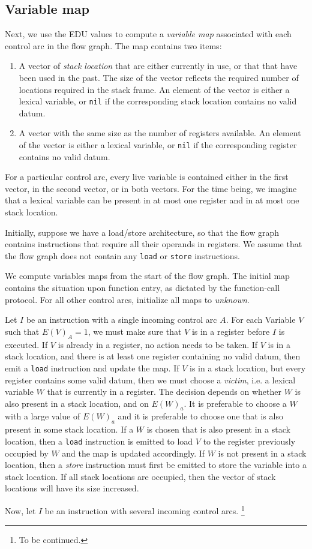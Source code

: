 \subsection{Variable map}

Next, we use the EDU values to compute a \emph{variable map}
associated with each control arc in the flow graph.  The map contains
two items:

\begin{enumerate}
\item A vector of \emph{stack location} that are either currently in
  use, or that that have been used in the past.  The size of the
  vector reflects the required number of locations required in the
  stack frame.  An element of the vector is either a lexical variable,
  or \texttt{nil} if the corresponding stack location contains no
  valid datum.
\item A vector with the same size as the number of registers
  available.  An element of the vector is either a lexical variable,
  or \texttt{nil} if the corresponding register contains no valid
  datum.
\end{enumerate}

For a particular control arc, every live variable is contained either
in the first vector, in the second vector, or in both vectors.  For
the time being, we imagine that a lexical variable can be present in
at most one register and in at most one stack location.

Initially, suppose we have a load/store architecture, so that the flow
graph contains instructions that require all their operands in
registers.  We assume that the flow graph does not contain any
\texttt{load} or \texttt{store} instructions.

We compute variables maps from the start of the flow graph.  The
initial map contains the situation upon function entry, as dictated by
the function-call protocol.  For all other control arcs, initialize
all maps to \emph{unknown}.

Let $I$ be an instruction with a single incoming control arc $A$.  For
each Variable $V$ such that $E(V)_A = 1$, we must make sure that $V$
is in a register before $I$ is executed.  If $V$ is already in a
register, no action needs to be taken.  If $V$ is in a stack location,
and there is at least one register containing no valid datum, then
emit a \texttt{load} instruction and update the map.  If $V$ is in a
stack location, but every register contains some valid datum, then we
must choose a \emph{victim}, i.e. a lexical variable $W$ that is
currently in a register.  The decision depends on whether $W$ is also
present in a stack location, and on $E(W)_a$.  It is preferable to
choose a $W$ with a large value of $E(W)_a$ and it is preferable to
choose one that is also present in some stack location.  If a $W$ is
chosen that is also present in a stack location, then a \texttt{load}
instruction is emitted to load $V$ to the register previously occupied
by $W$ and the map is updated accordingly.  If $W$ is not present in a
stack location, then a \emph{store} instruction must first be emitted
to store the variable into a stack location.  If all stack locations
are occupied, then the vector of stack locations will have its size
increased.

Now, let $I$ be an instruction with several incoming control arcs.%
\footnote{To be continued.}
